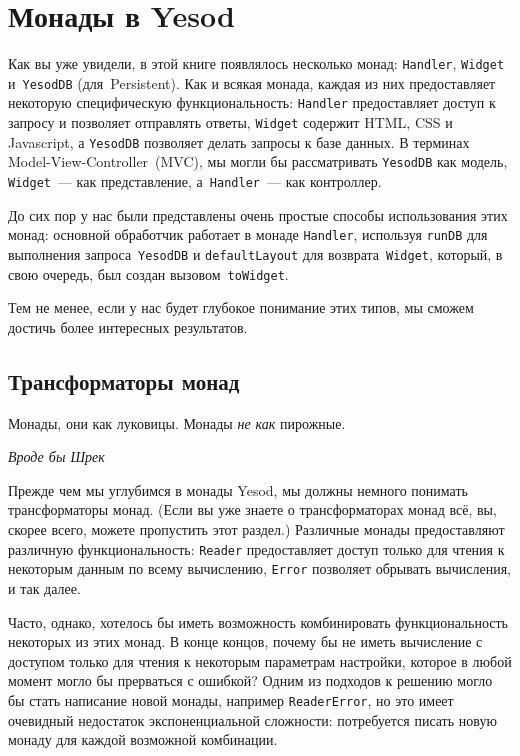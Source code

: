 \chapter{Монады в Yesod}\label{chap:yesod_monads}

Как вы уже увидели, в этой книге появлялось несколько монад:
\lstinline'Handler', \lstinline'Widget' и~\lstinline'YesodDB' (для~Persistent).
Как и всякая монада, каждая из них предоставляет некоторую специфическую
функциональность: \lstinline'Handler' предоставляет доступ к запросу и позволяет
отправлять ответы, \lstinline'Widget' содержит HTML, CSS и Javascript, а
\lstinline'YesodDB' позволяет делать запросы к базе данных. В терминах
Model-View-Controller~(MVC), мы могли бы рассматривать \lstinline'YesodDB' как
модель, \lstinline'Widget'~--- как представление, а~\lstinline'Handler'~--- как
контроллер.

До сих пор у нас были представлены очень простые способы использования этих
монад: основной обработчик работает в монаде \lstinline'Handler', используя
\lstinline'runDB' для выполнения запроса~\lstinline'YesodDB' и
\lstinline'defaultLayout' для возврата~\lstinline'Widget', который, в свою
очередь, был создан вызовом~\lstinline'toWidget'.

Тем не менее, если у нас будет глубокое понимание этих типов, мы сможем достичь
более интересных результатов.

\section{Трансформаторы монад}
\hfill \begin{minipage}[h]{0.45\textwidth}
    \small
    Монады, они как луковицы. Монады \emph{не как} пирожные.
    \begin{flushright}
        \emph{Вроде бы Шрек}
    \end{flushright}
\end{minipage}
\vspace{2em}

Прежде чем мы углубимся в монады Yesod, мы должны немного понимать
трансформаторы монад.  (Если вы уже знаете о трансформаторах монад всё, вы,
скорее всего, можете пропустить этот раздел.) Различные монады предоставляют
различную функциональность: \lstinline'Reader' предоставляет доступ только для
чтения к некоторым данным по всему вычислению, \lstinline'Error' позволяет
обрывать вычисления, и так далее.

Часто, однако, хотелось бы иметь возможность комбинировать функциональность
некоторых из этих монад. В конце концов, почему бы не иметь вычисление с
доступом только для чтения к некоторым параметрам настройки, которое в любой
момент могло бы прерваться с ошибкой? Одним из подходов к решению могло бы стать
написание новой монады, например \lstinline'ReaderError', но это имеет очевидный
недостаток экспоненциальной сложности: потребуется писать новую монаду для
каждой возможной комбинации.

